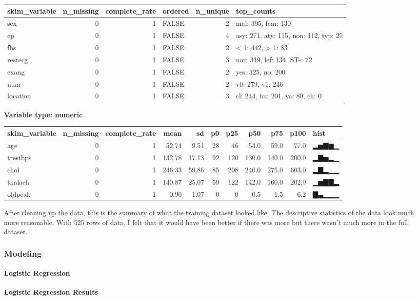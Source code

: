 \documentclass[
]{article}
\begin{document}
\begin{longtable}[]{@{}lrrlrl@{}}
\toprule
skim\_variable & n\_missing & complete\_rate & ordered & n\_unique &
top\_counts\tabularnewline
\midrule
\endhead
sex & 0 & 1 & FALSE & 2 & mal: 395, fem: 130\tabularnewline
cp & 0 & 1 & FALSE & 4 & asy: 271, aty: 115, non: 112, typ:
27\tabularnewline
fbs & 0 & 1 & FALSE & 2 & \textless{} 1: 442, \textgreater{} 1:
83\tabularnewline
restecg & 0 & 1 & FALSE & 3 & nor: 319, lef: 134, ST-: 72\tabularnewline
exang & 0 & 1 & FALSE & 2 & yes: 325, no: 200\tabularnewline
num & 0 & 1 & FALSE & 2 & v0: 279, v1: 246\tabularnewline
location & 0 & 1 & FALSE & 3 & cl: 244, hu: 201, va: 80, ch:
0\tabularnewline
\bottomrule
\end{longtable}

\textbf{Variable type: numeric}

\begin{longtable}[]{@{}lrrrrrrrrrl@{}}
\toprule
skim\_variable & n\_missing & complete\_rate & mean & sd & p0 & p25 &
p50 & p75 & p100 & hist\tabularnewline
\midrule
\endhead
age & 0 & 1 & 52.74 & 9.51 & 28 & 46 & 54.0 & 59.0 & 77.0 &
▂▅▇▆▁\tabularnewline
trestbps & 0 & 1 & 132.78 & 17.13 & 92 & 120 & 130.0 & 140.0 & 200.0 &
▂▇▅▂▁\tabularnewline
chol & 0 & 1 & 246.33 & 59.86 & 85 & 208 & 240.0 & 275.0 & 603.0 &
▂▇▂▁▁\tabularnewline
thalach & 0 & 1 & 140.87 & 25.07 & 69 & 122 & 142.0 & 160.0 & 202.0 &
▁▅▇▇▂\tabularnewline
oldpeak & 0 & 1 & 0.90 & 1.07 & 0 & 0 & 0.5 & 1.5 & 6.2 &
▇▃▁▁▁\tabularnewline
\bottomrule
\end{longtable}

After cleaning up the data, this is the summary of what the training
dataset looked like. The descriptive statistics of the data look much
more reasonable. With 525 rows of data, I felt that it would have been
better if there was more but there wasn't much more in the full dataset.

\hypertarget{modeling}{%
\subsubsection{Modeling}\label{modeling}}

\hypertarget{logistic-regression}{%
\paragraph{Logistic Regression}\label{logistic-regression}}

\hypertarget{logistic-regression-results}{%
\paragraph{Logistic Regression
Results}\label{logistic-regression-results}}
\end{document}
